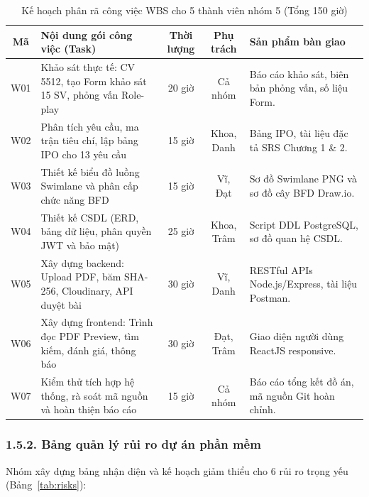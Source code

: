 \begin{table}[htbp]
\centering
\small
\caption{Kế hoạch phân rã công việc WBS cho 5 thành viên nhóm 5 (Tổng 150 giờ)}
\label{tab:wbs}
\begin{tabularx}{\textwidth}{|c|X|c|c|p{3.2cm}|}
\hline
\textbf{Mã} & \textbf{Nội dung gói công việc (Task)} & \textbf{Thời lượng} & \textbf{Phụ trách} & \textbf{Sản phẩm bàn giao} \\
\hline
W01 & Khảo sát thực tế: CV 5512, tạo Form khảo sát 15 SV, phỏng vấn Role-play & 20 giờ & Cả nhóm & Báo cáo khảo sát, biên bản phỏng vấn, số liệu Form. \\
\hline
W02 & Phân tích yêu cầu, ma trận tiêu chí, lập bảng IPO cho 13 yêu cầu & 15 giờ & Khoa, Danh & Bảng IPO, tài liệu đặc tả SRS Chương 1 \& 2. \\
\hline
W03 & Thiết kế biểu đồ luồng Swimlane và phân cấp chức năng BFD & 15 giờ & Vĩ, Đạt & Sơ đồ Swimlane PNG và sơ đồ cây BFD Draw.io. \\
\hline
W04 & Thiết kế CSDL (ERD, bảng dữ liệu, phân quyền JWT và bảo mật) & 25 giờ & Khoa, Trâm & Script DDL PostgreSQL, sơ đồ quan hệ CSDL. \\
\hline
W05 & Xây dựng backend: Upload PDF, băm SHA-256, Cloudinary, API duyệt bài & 30 giờ & Vĩ, Danh & RESTful APIs Node.js/Express, tài liệu Postman. \\
\hline
W06 & Xây dựng frontend: Trình đọc PDF Preview, tìm kiếm, đánh giá, thông báo & 30 giờ & Đạt, Trâm & Giao diện người dùng ReactJS responsive. \\
\hline
W07 & Kiểm thử tích hợp hệ thống, rà soát mã nguồn và hoàn thiện báo cáo & 15 giờ & Cả nhóm & Báo cáo tổng kết đồ án, mã nguồn Git hoàn chỉnh. \\
\hline
\end{tabularx}
\end{table}

\subsubsection{1.5.2. Bảng quản lý rủi ro dự án phần mềm}
Nhóm xây dựng bảng nhận diện và kế hoạch giảm thiểu cho 6 rủi ro trọng yếu (Bảng~\ref{tab:risks}):

